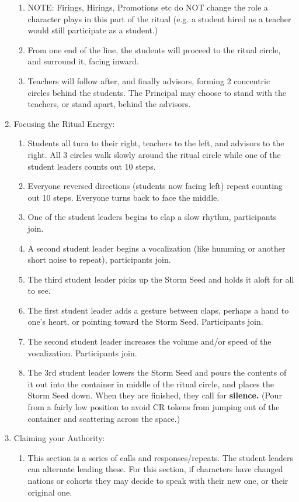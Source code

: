 \documentclass[green]{GL2020}
\begin{document}
\begin{enumerate}
\begin{enumerate}
\item NOTE: Firings, Hirings, Promotions etc do NOT change the role a character plays in this part of the ritual (e.g. a student hired as a teacher would still participate as a student.)
\item From one end of the line, the students will proceed to the ritual circle, and surround it, facing inward.
\item Teachers will follow after, and finally advisors, forming 2 concentric circles behind the students. The Principal may choose to stand with the teachers, or stand apart, behind the advisors.
\end{enumerate}
\item Focusing the Ritual Energy:
\begin{enumerate}
\item Students all turn to their right, teachers to the left, and advisors to the right. All 3 circles walk slowly around the ritual circle while one of the student leaders counts out 10 steps. 
\item Everyone reversed directions (students now facing left) repeat counting out 10 steps. Everyone turns back to face the middle.
\item One of the student leaders begins to clap a slow rhythm, participants join.
\item A second student leader begins a vocalization (like humming or another short noise to repeat), participants join.
\item The third student leader picks up the Storm Seed and holds it aloft for all to see.
\item The first student leader adds a gesture between claps, perhaps a hand to one’s heart, or pointing toward the Storm Seed. Participants join.
\item The second student leader increases the volume and/or speed of the vocalization. Participants join.
\item The 3rd student leader lowers the Storm Seed and pours the contents of it out into the container in middle of the ritual circle, and places the Storm Seed down. When they are finished, they call for \textbf{silence.} (Pour from a fairly low position to avoid CR tokens from jumping out of the container and scattering across the space.)
\end{enumerate}
\item Claiming your Authority:
\begin{enumerate}
\item This section is a series of calls and responses/repeats. The student leaders can alternate leading these. For this section, if characters have changed nations or cohorts they may decide to speak with their new one, or their original one.

\end{enumerate}
\end{enumerate}
\end{document}
